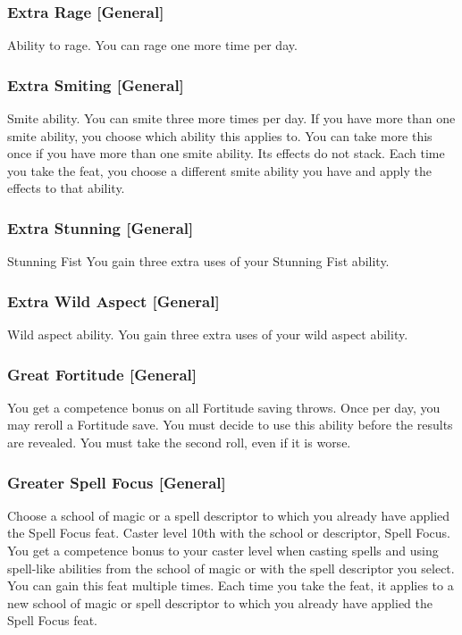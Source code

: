 \subsubsection{Extra Rage [General]}
 Ability to rage.
 You can rage one more time per day.

\subsubsection{Extra Smiting [General]}
 Smite ability.
 You can smite three more times per day. If you have more than one smite ability, you choose which ability this applies to.
 You can take more this once if you have more than one smite ability. Its effects do not stack. Each time you take the feat, you choose a different smite ability you have and apply the effects to that ability.

\subsubsection{Extra Stunning [General]}
 Stunning Fist
 You gain three extra uses of your Stunning Fist ability.

\subsubsection{Extra Wild Aspect [General]}
 Wild aspect ability.
 You gain three extra uses of your wild aspect ability.

\subsubsection{Great Fortitude [General]}
 You get a  competence bonus on all Fortitude saving throws. Once per day, you may reroll a Fortitude save. You must decide to use this ability before the results are revealed. You must take the second roll, even if it is worse.

\subsubsection{Greater Spell Focus [General]}
Choose a school of magic or a spell descriptor to which you already have applied the Spell Focus feat.
 Caster level 10th with the school or descriptor, Spell Focus.
 You get a  competence bonus to your caster level when casting spells and using spell-like abilities from the school of magic or with the spell descriptor you select.
 You can gain this feat multiple times. Each time you take the feat, it applies to a new school of magic or spell descriptor to which you already have applied the Spell Focus feat.

